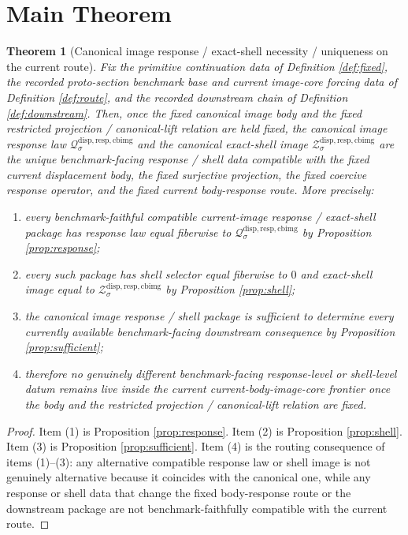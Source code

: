 \documentclass[11pt]{article}
\newcommand{\CanonicalImageShell}[1]{\mathcal Z_{#1}^{\mathrm{disp,resp,cbimg}}}
\newcommand{\CanonicalImageResponseLaw}[1]{\mathscr Q_{#1}^{\mathrm{disp,resp,cbimg}}}
\newtheorem{theorem}{Theorem}
\begin{document}
\section{Main Theorem}

\begin{theorem}[Canonical image response / exact-shell necessity / uniqueness on the current route]
\label{thm:main}
Fix the primitive continuation data of Definition \ref{def:fixed}, the recorded proto-section benchmark base and current image-core forcing data of Definition \ref{def:route}, and the recorded downstream chain of Definition \ref{def:downstream}. Then, once the fixed canonical image body and the fixed restricted projection / canonical-lift relation are held fixed, the canonical image response law \(\CanonicalImageResponseLaw{\sigma}\) and the canonical exact-shell image \(\CanonicalImageShell{\sigma}\) are the unique benchmark-facing response / shell data compatible with the fixed current displacement body, the fixed surjective projection, the fixed coercive response operator, and the fixed current body-response route. More precisely:
\begin{enumerate}
    \item every benchmark-faithful compatible current-image response / exact-shell package has response law equal fiberwise to \(\CanonicalImageResponseLaw{\sigma}\) by Proposition \ref{prop:response};
    \item every such package has shell selector equal fiberwise to \(0\) and exact-shell image equal to \(\CanonicalImageShell{\sigma}\) by Proposition \ref{prop:shell};
    \item the canonical image response / shell package is sufficient to determine every currently available benchmark-facing downstream consequence by Proposition \ref{prop:sufficient};
    \item therefore no genuinely different benchmark-facing response-level or shell-level datum remains live inside the current current-body-image-core frontier once the body and the restricted projection / canonical-lift relation are fixed.
\end{enumerate}
\end{theorem}

\begin{proof}
Item (1) is Proposition \ref{prop:response}. Item (2) is Proposition \ref{prop:shell}. Item (3) is Proposition \ref{prop:sufficient}. Item (4) is the routing consequence of items (1)--(3): any alternative compatible response law or shell image is not genuinely alternative because it coincides with the canonical one, while any response or shell data that change the fixed body-response route or the downstream package are not benchmark-faithfully compatible with the current route.
\end{proof}
\end{document}
